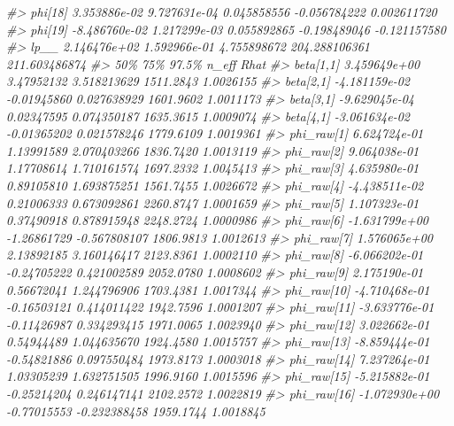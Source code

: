 \documentclass[
]{article}
\newenvironment{Shaded}{\begin{snugshade}}{\end{snugshade}}
\newcommand{\CommentTok}[1]{\textcolor[rgb]{0.56,0.35,0.01}{\textit{#1}}}
\begin{document}
\begin{Shaded}
\begin{Highlighting}[]
\CommentTok{\#\textgreater{} phi[18]      3.353886e{-}02 9.727631e{-}04 0.045858556  {-}0.056784222   0.002611720}
\CommentTok{\#\textgreater{} phi[19]     {-}8.486760e{-}02 1.217299e{-}03 0.055892865  {-}0.198489046  {-}0.121157580}
\CommentTok{\#\textgreater{} lp\_\_         2.146476e+02 1.592966e{-}01 4.755898672 204.288106361 211.603486874}
\CommentTok{\#\textgreater{}                       50\%          75\%         97.5\%     n\_eff      Rhat}
\CommentTok{\#\textgreater{} beta[1,1]    3.459649e+00   3.47952132   3.518213629 1511.2843 1.0026155}
\CommentTok{\#\textgreater{} beta[2,1]   {-}4.181159e{-}02  {-}0.01945860   0.027638929 1601.9602 1.0011173}
\CommentTok{\#\textgreater{} beta[3,1]   {-}9.629045e{-}04   0.02347595   0.074350187 1635.3615 1.0009074}
\CommentTok{\#\textgreater{} beta[4,1]   {-}3.061634e{-}02  {-}0.01365202   0.021578246 1779.6109 1.0019361}
\CommentTok{\#\textgreater{} phi\_raw[1]   6.624724e{-}01   1.13991589   2.070403266 1836.7420 1.0013119}
\CommentTok{\#\textgreater{} phi\_raw[2]   9.064038e{-}01   1.17708614   1.710161574 1697.2332 1.0045413}
\CommentTok{\#\textgreater{} phi\_raw[3]   4.635980e{-}01   0.89105810   1.693875251 1561.7455 1.0026672}
\CommentTok{\#\textgreater{} phi\_raw[4]  {-}4.438511e{-}02   0.21006333   0.673092861 2260.8747 1.0001659}
\CommentTok{\#\textgreater{} phi\_raw[5]   1.107323e{-}01   0.37490918   0.878915948 2248.2724 1.0000986}
\CommentTok{\#\textgreater{} phi\_raw[6]  {-}1.631799e+00  {-}1.26861729  {-}0.567808107 1806.9813 1.0012613}
\CommentTok{\#\textgreater{} phi\_raw[7]   1.576065e+00   2.13892185   3.160146417 2123.8361 1.0002110}
\CommentTok{\#\textgreater{} phi\_raw[8]  {-}6.066202e{-}01  {-}0.24705222   0.421002589 2052.0780 1.0008602}
\CommentTok{\#\textgreater{} phi\_raw[9]   2.175190e{-}01   0.56672041   1.244796906 1703.4381 1.0017344}
\CommentTok{\#\textgreater{} phi\_raw[10] {-}4.710468e{-}01  {-}0.16503121   0.414011422 1942.7596 1.0001207}
\CommentTok{\#\textgreater{} phi\_raw[11] {-}3.633776e{-}01  {-}0.11426987   0.334293415 1971.0065 1.0023940}
\CommentTok{\#\textgreater{} phi\_raw[12]  3.022662e{-}01   0.54944489   1.044635670 1924.4580 1.0015757}
\CommentTok{\#\textgreater{} phi\_raw[13] {-}8.859444e{-}01  {-}0.54821886   0.097550484 1973.8173 1.0003018}
\CommentTok{\#\textgreater{} phi\_raw[14]  7.237264e{-}01   1.03305239   1.632751505 1996.9160 1.0015596}
\CommentTok{\#\textgreater{} phi\_raw[15] {-}5.215882e{-}01  {-}0.25214204   0.246147141 2102.2572 1.0022819}
\CommentTok{\#\textgreater{} phi\_raw[16] {-}1.072930e+00  {-}0.77015553  {-}0.232388458 1959.1744 1.0018845}

\end{Highlighting}
\end{Shaded}
\end{document}
